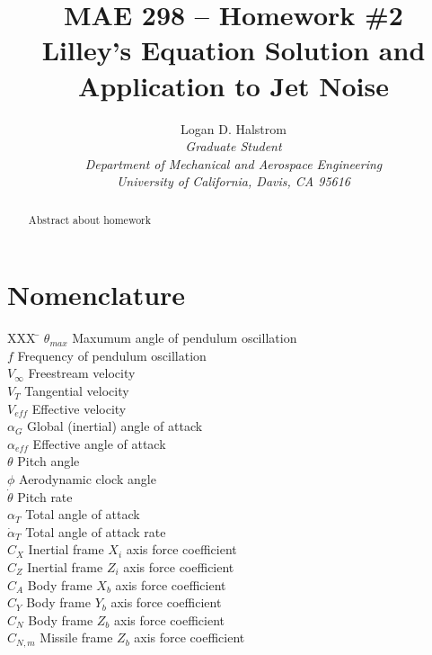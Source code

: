 \documentclass[]{aiaa-tc}%
\title{MAE 298 -- Homework \#2 \\ Lilley's Equation Solution and Application to Jet Noise}
\author{
  Logan D. Halstrom \\
  {\normalsize\itshape Graduate Student} \\
  {\normalsize\itshape Department of Mechanical and Aerospace Engineering} \\
  {\normalsize\itshape University of California, Davis, CA 95616}
       }
\begin{document}
\maketitle

\begin{abstract}

Abstract about homework

\end{abstract}

\section*{Nomenclature}

\begin{multicols}{2}

\begin{tabbing}
  XXX \= \kill%
  $\theta_{max}$      \> Maxumum angle of pendulum oscillation \\
  $f$                 \> Frequency of pendulum oscillation \\
  $V_{\infty}$        \> Freestream velocity \\
  $V_{T}$             \> Tangential velocity \\
  $V_{eff}$           \> Effective velocity \\
  $\alpha_{G}$        \> Global (inertial) angle of attack \\
  $\alpha_{eff}$      \> Effective angle of attack \\
  $\theta$            \> Pitch angle \\
  $\phi$              \> Aerodynamic clock angle \\
  $\dot{\theta}$      \> Pitch rate \\
  $\alpha_{T}$        \> Total angle of attack \\
  $\dot{\alpha}_{T}$  \> Total angle of attack rate \\
  $C_X$         \> Inertial frame $X_i$ axis force coefficient \\
  $C_Z$         \> Inertial frame $Z_i$ axis force coefficient \\
  $C_A$         \> Body frame $X_b$ axis force coefficient \\
  $C_Y$         \> Body frame $Y_b$ axis force coefficient \\
  $C_N$         \> Body frame $Z_b$ axis force coefficient \\
  $C_{N,m}$         \> Missile frame $Z_b$ axis force coefficient \\


\end{tabbing}
\end{multicols}
\end{document}
